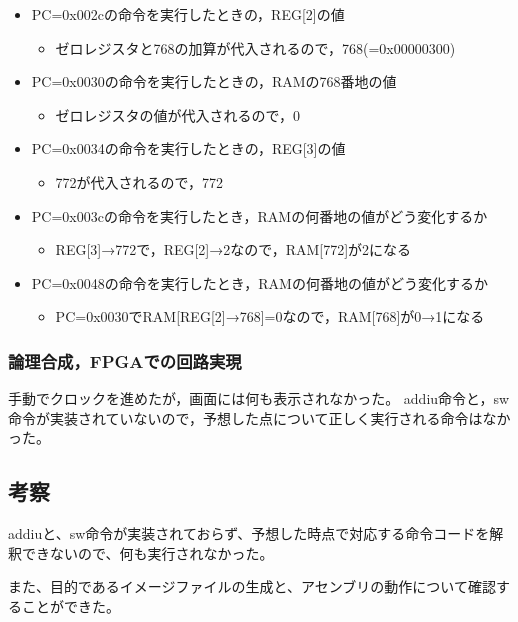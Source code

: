 \begin{itemize}
  \item PC=0x002cの命令を実行したときの，REG[2]の値
  \begin{itemize}
    \item ゼロレジスタと768の加算が代入されるので，768(=0x00000300)
  \end{itemize}
  \item PC=0x0030の命令を実行したときの，RAMの768番地の値
  \begin{itemize}
    \item ゼロレジスタの値が代入されるので，0
  \end{itemize}
  \item PC=0x0034の命令を実行したときの，REG[3]の値
  \begin{itemize}
    \item 772が代入されるので，772
  \end{itemize}
  \item PC=0x003cの命令を実行したとき，RAMの何番地の値がどう変化するか
  \begin{itemize}
    \item REG[3]→772で，REG[2]→2なので，RAM[772]が2になる
  \end{itemize}
  \item PC=0x0048の命令を実行したとき，RAMの何番地の値がどう変化するか
  \begin{itemize}
    \item PC=0x0030でRAM[REG[2]→768]=0なので，RAM[768]が0→1になる
  \end{itemize}
\end{itemize}

\subsubsection{論理合成，FPGAでの回路実現}
手動でクロックを進めたが，画面には何も表示されなかった。
addiu命令と，sw命令が実装されていないので，予想した点について正しく実行される命令はなかった。

\subsection{考察}
addiuと、sw命令が実装されておらず、予想した時点で対応する命令コードを解釈できないので、何も実行されなかった。

また、目的であるイメージファイルの生成と、アセンブリの動作について確認することができた。
